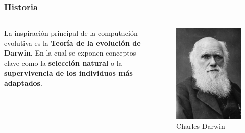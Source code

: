 \documentclass{beamer}
\begin{document}
\begin{frame}
\frametitle{Historia}

\begin{columns}
La inspiración principal de la computación evolutiva es la \textbf{Teoría de la evolución de Darwin}. En la cual se exponen conceptos clave como la \textbf{selección natural} o la \textbf{supervivencia de los individuos más adaptados}.

\begin{figure}
    \centering
    \includegraphics[scale=0.15]{pres/img/darwin.jpg}
    \caption{Charles Darwin}
    \label{fig:darwin}
\end{figure}
\end{columns}

\end{frame}
\end{document}
